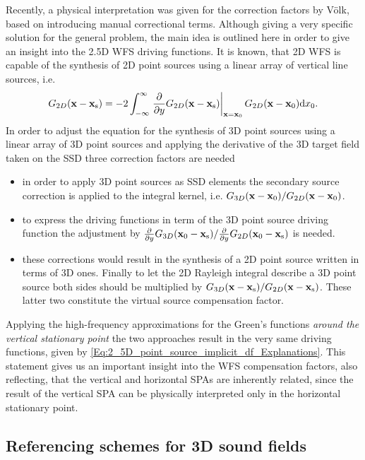 Recently, a physical interpretation was given for the correction factors by Völk\cite{Voelk2012}, based on introducing manual correctional terms. 
Although giving a very specific solution for the general problem, the main idea is outlined here in order to give an insight into the 2.5D WFS driving functions. 
It is known, that 2D WFS is capable of the synthesis of 2D point sources using a linear array of vertical line sources, i.e.
\begin{equation}
G_{2D}(\mathbf{x}-\mathbf{x}_{\mathrm{s}}) = -2\int_{-\infty}^{\infty} \left. \frac{\partial}{\partial y}G_{2D}(\mathbf{x}-\mathbf{x}_{\mathrm{s}})\right|_{\mathbf{x} = \mathbf{x}_0} G_{2D}(\mathbf{x}-\mathbf{x}_0)\mathrm{d} x_0.
\end{equation}
In order to adjust the equation for the synthesis of 3D point sources using a linear array of 3D point sources and applying the derivative of the 3D target field taken on the SSD three correction factors are needed
\begin{itemize}
\item in order to apply 3D point sources as SSD elements the secondary source correction is applied to the integral kernel, i.e. $G_{3D}(\mathbf{x}-\mathbf{x}_0)/G_{2D}(\mathbf{x}-\mathbf{x}_0)$.
\item to express the driving functions in term of the 3D point source driving function the adjustment by $\frac{\partial}{\partial y} G_{3D}(\mathbf{x}_0-\mathbf{x}_{\mathrm{s}})/\frac{\partial}{\partial y} G_{2D}(\mathbf{x}_0-\mathbf{x}_{\mathrm{s}})$ is needed.
\item these corrections would result in the synthesis of a 2D point source written in terms of 3D ones. 
Finally to let the 2D Rayleigh integral describe a 3D point source both sides should be multiplied by $G_{3D}(\mathbf{x}-\mathbf{x}_{\mathrm{s}})/G_{2D}(\mathbf{x}-\mathbf{x}_{\mathrm{s}})$.
These latter two constitute the virtual source compensation factor.
\end{itemize}
Applying the high-frequency approximations for the Green's functions \emph{around the vertical stationary point} the two approaches result in the very same driving functions, given by \eqref{Eq:2_5D_point_source_implicit_df_Explanations}.
This statement gives us an important insight into the WFS compensation factors, also reflecting, that the vertical and horizontal SPAs are inherently related, since the result of the vertical SPA can be physically interpreted only in the horizontal stationary point.


\subsection{Referencing schemes for 3D sound fields}

